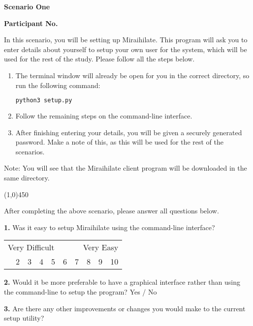 \begin{center}
	\textbf{Scenario One}\par
	\textbf{Participant No.}\par
\end{center}

In this scenario, you will be setting up Miraihilate. This program will ask you to enter details about yourself to setup your own user for the system, which will be used for the rest of the study. Please follow all the steps below.

\vspace{0.5cm}

\begin{enumerate}
	\item{
		The terminal window will already be open for you in the correct directory, so run the following command:\par
		\begin{lstlisting}[language=bash]
			python3 setup.py
		\end{lstlisting}
	}
	\item{Follow the remaining steps on the command-line interface.}
	\item{After finishing entering your details, you will be given a securely generated password. Make a note of this, as this will be used for the rest of the scenarios.}
\end{enumerate}

\begin{center}
	Note: You will see that the Miraihilate client program will be downloaded in the same directory.
\end{center}

\begin{center}
	\line(1,0){450}
\end{center}

After completing the above scenario, please answer all questions below.

\vspace{0.5cm}

\textbf{1.} Was it easy to setup Miraihilate using the command-line interface?

\begin{table}[h]
	\centering
	\begin{tabularx}{\textwidth}{XXXXXXXXXX}
		\multicolumn{5}{l}{Very Difficult} & \multicolumn{5}{r}{Very Easy} \\
		\centering
		1    & 2    & 3    & 4    & 5    & 6    & 7    & 8    & 9    & 10
	\end{tabularx}
\end{table}

\textbf{2.} Would it be more preferable to have a graphical interface rather than using the command-line to setup the program? \tab Yes / No

\vspace{0.5cm}

\textbf{3.} Are there any other improvements or changes you would make to the current setup utility?
